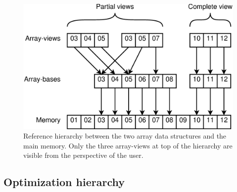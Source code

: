 \documentclass{sigplanconf}
\begin{document}
\begin{figure}
 \centering
 \includegraphics[width=\linewidth]{gfx/views}
 \caption{Reference hierarchy between the two array data structures and the main memory. Only the three array-views at top of the hierarchy are visible from the perspective of the user.}
 \label{fig:views}
\end{figure}

\subsection{Optimization hierarchy}

\end{document}
